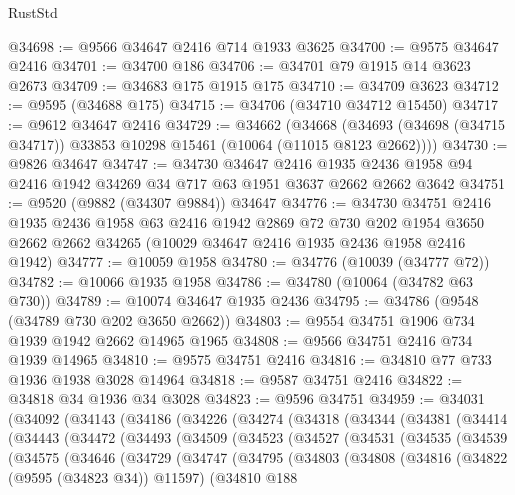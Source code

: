 \begin{lexlean}{RustStd}
\begin{coremodule}
@34698 := @9566 @34647 @2416 @714 @1933 @3625
@34700 := @9575 @34647 @2416
@34701 := @34700 @186
@34706 := @34701 @79 @1915 @14 @3623 @2673
@34709 := @34683 @175 @1915 @175
@34710 := @34709 @3623
@34712 := @9595 (@34688 @175)
@34715 := @34706 (@34710 @34712 @15450)
@34717 := @9612 @34647 @2416
@34729 := @34662
    (@34668 (@34693 (@34698 (@34715 @34717)) @33853 @10298 @15461 (@10064 (@11015 @8123 @2662))))
@34730 := @9826 @34647
@34747 := @34730
    @34647
    @2416
    @1935
    @2436
    @1958
    @94
    @2416
    @1942
    @34269
    @34
    @717
    @63
    @1951
    @3637
    @2662
    @2662
    @3642
@34751 := @9520 (@9882 (@34307 @9884)) @34647
@34776 := @34730
    @34751
    @2416
    @1935
    @2436
    @1958
    @63
    @2416
    @1942
    @2869
    @72
    @730
    @202
    @1954
    @3650
    @2662
    @2662
    @34265
    (@10029 @34647 @2416 @1935 @2436 @1958 @2416 @1942)
@34777 := @10059 @1958
@34780 := @34776 (@10039 (@34777 @72))
@34782 := @10066 @1935 @1958
@34786 := @34780 (@10064 (@34782 @63 @730))
@34789 := @10074 @34647 @1935 @2436
@34795 := @34786 (@9548 (@34789 @730 @202 @3650 @2662))
@34803 := @9554 @34751 @1906 @734 @1939 @1942 @2662 @14965 @1965
@34808 := @9566 @34751 @2416 @734 @1939 @14965
@34810 := @9575 @34751 @2416
@34816 := @34810 @77 @733 @1936 @1938 @3028 @14964
@34818 := @9587 @34751 @2416
@34822 := @34818 @34 @1936 @34 @3028
@34823 := @9596 @34751
@34959 := @34031
    (@34092
      (@34143
        (@34186
          (@34226
            (@34274
              (@34318
                (@34344
                  (@34381
                    (@34414
                      (@34443
                        (@34472
                          (@34493
                            (@34509
                              (@34523
                                (@34527
                                  (@34531
                                    (@34535
                                      (@34539
                                        (@34575
                                          (@34646
                                            (@34729
                                              (@34747
                                                (@34795
                                                  (@34803
                                                    (@34808
                                                      (@34816
                                                        (@34822 (@9595 (@34823 @34)) @11597)
                                                        (@34810
                                                          @188

\end{coremodule}
\end{lexlean}
